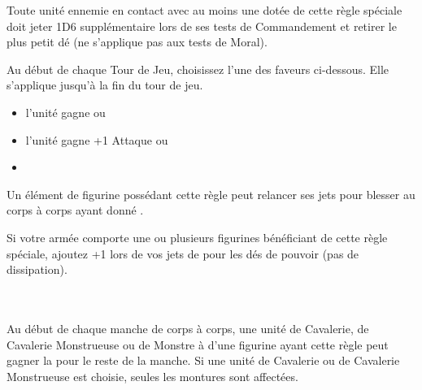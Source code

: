 \armyspecialruleentry{\auraofdespair}

Toute unité ennemie en contact avec au moins une  dotée de cette règle spéciale doit jeter 1D6 supplémentaire lors de ses tests de Commandement et retirer le plus petit dé (ne s'applique pas aux tests de Moral).

\armyspecialruleentry{\divineblessings}
Au début de chaque Tour de Jeu, choisissez l'une des faveurs ci-dessous. Elle s'applique jusqu'à la fin du tour de jeu. 
\begin{itemize}[label={-}]
	\item l'unité gagne  ou
	\item l'unité gagne +1 Attaque  ou
	\item {}
\end{itemize}

\armyspecialruleentry{\killerinstinct}

Un élément de figurine possédant cette règle peut relancer ses jets pour blesser au corps à corps ayant donné .

\armyspecialruleentry{\masterofthedarkarts}

Si votre armée comporte une ou plusieurs figurines bénéficiant de cette règle spéciale, ajoutez +1 lors de vos jets de \channel pour les dés de pouvoir (pas de dissipation).

\armyspecialruleentry{\beastmaster}

 \\\\
Au début de chaque manche de corps à corps, une unité  de Cavalerie, de Cavalerie Monstrueuse ou de Monstre à  d'une figurine ayant cette règle peut gagner la \hatred pour le reste de la manche. Si une unité de Cavalerie ou de Cavalerie Monstrueuse est choisie, seules les montures sont affectées. 

